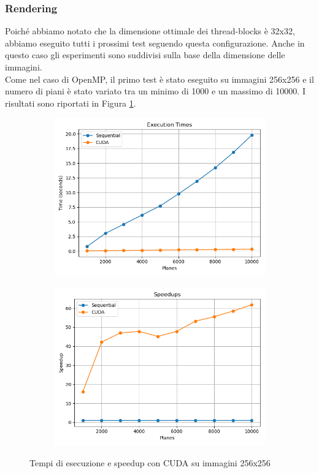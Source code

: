 \subsubsection{Rendering}
Poiché abbiamo notato che la dimensione ottimale dei thread-blocks è 32x32, abbiamo eseguito tutti i prossimi test seguendo questa configurazione.
Anche in questo caso gli esperimenti sono suddivisi sulla base della dimensione delle immagini.\\
Come nel caso di OpenMP, il primo test è stato eseguito su immagini 256x256 e il numero di piani è stato variato tra un minimo di 1000 e un massimo di 10000.
I risultati sono riportati in Figura \ref{fig:cuda_256}.
\begin{figure}[H]
    \centering
    \begin{subfigure}{0.49\textwidth}
        \centering
        \includegraphics[width=\textwidth]{../results/plots/256/cuda_times}
    \end{subfigure}
    \begin{subfigure}{0.49\textwidth}
        \centering
        \includegraphics[width=\textwidth]{../results/plots/256/cuda_speedup}
    \end{subfigure}
    \caption{Tempi di esecuzione e speedup con CUDA su immagini 256x256}
    \label{fig:cuda_256}
\end{figure}
